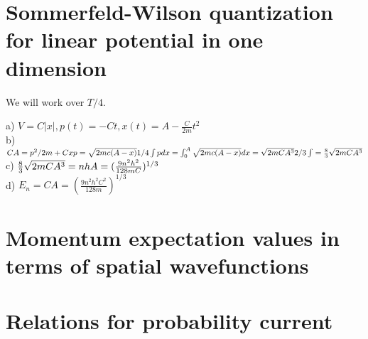 \documentclass{article}
\newcommand{\<}{\langle}
\renewcommand{\>}{\rangle}
\begin{document}
\section{Sommerfeld-Wilson quantization for linear potential in one dimension}

We will work over $T/4$. 

a)
$V = C|x|, p(t) = -Ct, x(t) = A - \frac{C}{2m} t^2$
\\
b)
$CA = p^2/2m + Cx \\
p = \sqrt{2mc(A-x)} \\
1/4\int p dx = \int_0^A\sqrt{2mc(A-x)}dx = \sqrt{2mCA^3} 2/3 \\
\int = \frac{8}{3} \sqrt{2mCA^3}
$
\\
c)
$
\frac{8}{3} \sqrt{2mCA^3} = nh \\
A = (\frac{9n^2h^2}{128mC})^{1/3}
$
\\
d)
$E_n = CA = (\frac{9n^2h^2C^2}{128m})^{1/3}$
\section{Momentum expectation values in terms of spatial wavefunctions}
\section{Relations for probability current}
\end{document}
